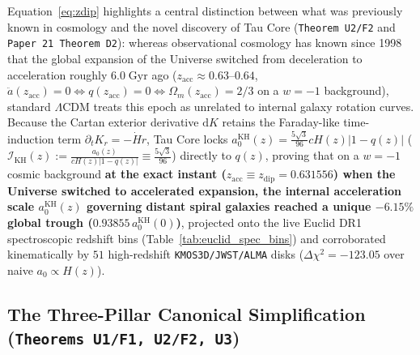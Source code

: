 \documentclass[11pt,a4paper]{article}
\begin{document}
Equation~\eqref{eq:zdip} highlights a central distinction between what was previously known in cosmology and the novel discovery of Tau Core (\texttt{Theorem U2/F2} and \texttt{Paper 21 Theorem D2}): whereas observational cosmology has known since 1998 that the global expansion of the Universe switched from deceleration to acceleration roughly $6.0\;\mathrm{Gyr}$ ago ($z_{\mathrm{acc}} \approx 0.63\text{--}0.64$, $\ddot{a}(z_{\mathrm{acc}}) = 0 \iff q(z_{\mathrm{acc}}) = 0 \iff \Omega_m(z_{\mathrm{acc}}) = 2/3$ on a $w=-1$ background), standard $\Lambda\mathrm{CDM}$ treats this epoch as unrelated to internal galaxy rotation curves. Because the Cartan exterior derivative $\mathrm{d}K$ retains the Faraday-like time-induction term $\partial_t K_r = -\dot{H}r$, Tau Core locks $a_0^{\mathrm{KH}}(z) = \frac{5\sqrt{3}}{96}cH(z)|1 - q(z)|$ ($\mathcal{I}_{\mathrm{KH}}(z) := \frac{a_0(z)}{cH(z)|1-q(z)|} \equiv \frac{5\sqrt{3}}{96}$) directly to $q(z)$, proving that on a $w = -1$ cosmic background \textbf{at the exact instant ($z_{\mathrm{acc}} \equiv z_{\mathrm{dip}} = 0.631556$) when the Universe switched to accelerated expansion, the internal acceleration scale $a_0^{\mathrm{KH}}(z)$ governing distant spiral galaxies reached a unique $-6.15\%$ global trough ($0.93855\,a_0^{\mathrm{KH}}(0)$)}, projected onto the live Euclid DR1 spectroscopic redshift bins (Table~\ref{tab:euclid_spec_bins}) and corroborated kinematically by $51$ high-redshift \texttt{KMOS3D/JWST/ALMA} disks ($\Delta\chi^2 = -123.05$ over naive $a_0\propto H(z)$).

\subsection{The Three-Pillar Canonical Simplification (\texorpdfstring{\texttt{Theorems U1/F1, U2/F2, U3}}{Theorems U1/F1, U2/F2, U3})}
\end{document}
